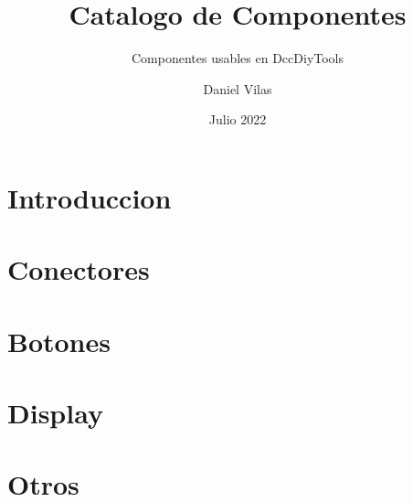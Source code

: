 \documentclass[spanish]{DccDiyTools/DccDiyTools}
\title{Catalogo de Componentes}
\subtitle{Componentes usables en DccDiyTools}
\author{Daniel Vilas}
\date{Julio 2022}
\begin{document}
\maketitle
\newpage
\section{Introduccion}


\newpage
\section{Conectores}


\newpage
\section{Botones}


\newpage
\section{Display}



\newpage
\section{Otros}

\end{document}
